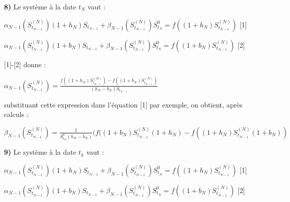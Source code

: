 \documentclass{article}
\begin{document}
\textbf{8)} Le système à la date $t_N$ vaut :



$\alpha_{N-1}(S_{t_{N-1}}^{(N)})(1 + h_N)S_{t_{N-1}} + \beta_{N-1}(S_{t_{N-1}}^{(N)})S_{t_N}^{0} = f((1+h_N)S_{t_{N-1}}^{(N)})$ \hspace{1cm} [1]

$\alpha_{N-1}(S_{t_{N-1}}^{(N)})(1+b_N)S_{t_{N-1}} + \beta_{N-1}(S_{t_{N-1}}^{(N)})S_{t_N}^{0} = f((1+b_N)S_{t_{N-1}}^{(N)})$ \hspace{1cm} [2]


[1]-[2] donne :

$\alpha_{N-1}(S_{t_{N-1}}^{(N)})=\frac{f((1+h_N)S_{t_{N-1}}^{(N)})-f((1+b_N)S_{t_{N-1}}^{(N)})}{(h_N-b_N)S_{t_{N-1}}}$


\En substituant cette expression dans l'équation [1] par exemple, on obtient, après calculs :

$\beta_{N-1}(S_{t_{N-1}}^{(N)})=\frac{1}{S_{t_N}^0(h_N-b_N)}(f((1+b_N)S_{t_{N-1}}^{(N)}(1+h_N)-f((1+h_N)S_{t_{N-1}}^{(N)}(1+b_N))$


\textbf{9)} Le système à la date $t_k$ vaut :

$\alpha_{N-1}(S_{t_{N-1}}^{(N)})(1 + h_N)S_{t_{N-1}} + \beta_{N-1}(S_{t_{N-1}}^{(N)})S_{t_N}^{0} = f((1+h_N)S_{t_{N-1}}^{(N)})$ \hspace{1cm} [1]

$\alpha_{N-1}(S_{t_{N-1}}^{(N)})(1+b_N)S_{t_{N-1}} + \beta_{N-1}(S_{t_{N-1}}^{(N)})S_{t_N}^{0} = f((1+b_N)S_{t_{N-1}}^{(N)})$ \hspace{1cm} [2]
\end{document}
